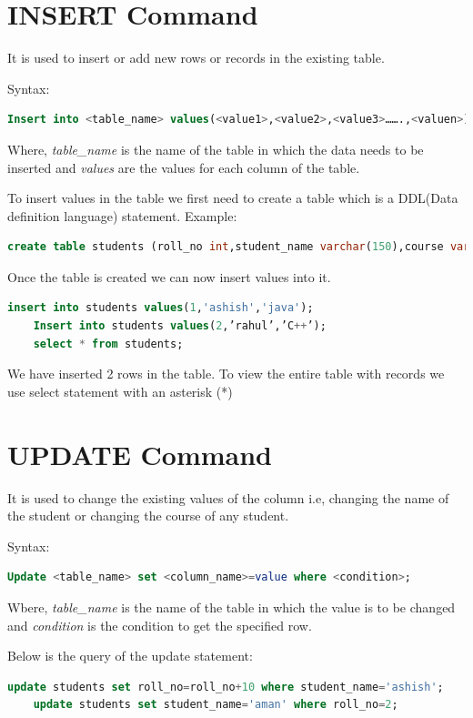\section{INSERT Command}
It is used to insert or add new rows or records in the existing table.

Syntax:
\begin{lstlisting}[language=sql]
	Insert into <table_name> values(<value1>,<value2>,<value3>…….,<valuen>);
\end{lstlisting}
Where, \textit{table\_name} is the name of the table in which the data needs to be inserted and \textit{values} are the values for each column of the table.

To insert values in the table we first need to create a table which is a DDL(Data definition language) statement.
Example:
\begin{lstlisting}[language=sql]
	create table students (roll_no int,student_name varchar(150),course varchar(150));
\end{lstlisting}
Once the table is created we can now insert values into it.
\begin{lstlisting}[language=sql]
	insert into students values(1,'ashish','java');
	Insert into students values(2,’rahul’,’C++’);
	select * from students;	
\end{lstlisting}
We have inserted 2 rows in the table. To view the entire table with records we use select statement with an asterisk (*)


\section{UPDATE Command}
It is used to change the existing values of the column i.e, changing the name of the student or changing the course of any student.

Syntax:
\begin{lstlisting}[language=sql]
	Update <table_name> set <column_name>=value where <condition>;
\end{lstlisting}
Wbere, \textit{table\_name} is the name of the table in which the value is to be changed and \textit{condition} is the condition to get the specified row.

Below is the query of the update statement:
\begin{lstlisting}[language=sql]
	update students set roll_no=roll_no+10 where student_name='ashish';
	update students set student_name='aman' where roll_no=2;	
\end{lstlisting}


